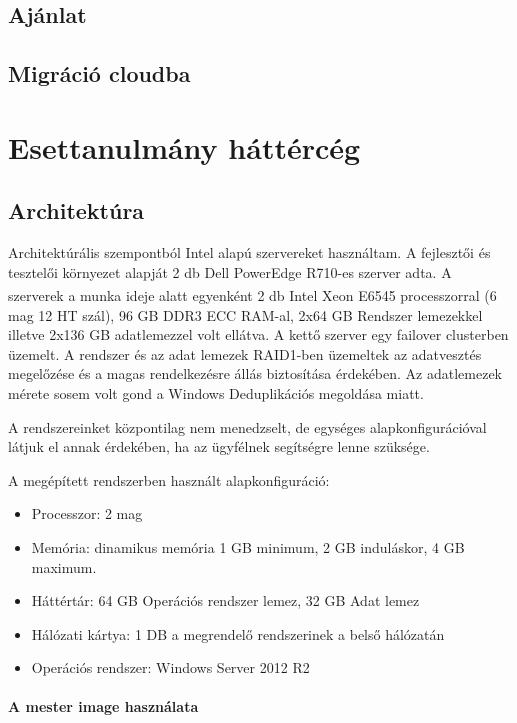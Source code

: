 \documentclass[12pt,oneside,justify,table]{book}
\begin{document}
\section{Ajánlat}


\section{Migráció cloudba}


\chapter{Esettanulmány háttércég}

\section{Architektúra}

Architektúrális szempontból Intel alapú szervereket használtam. A fejlesztői és tesztelői környezet alapját 2 db Dell PowerEdge R710-es szerver adta. A szerverek a munka ideje alatt egyenként 2 db Intel{\textsuperscript{\textregistered}} Xeon{\textsuperscript{\textregistered}} E6545 processzorral (6 mag 12 HT szál), 96 GB DDR3 ECC RAM-al, 2x64 GB Rendszer lemezekkel illetve 2x136 GB adatlemezzel volt ellátva. A kettő szerver egy failover clusterben üzemelt. A rendszer és az adat lemezek RAID1-ben üzemeltek az adatvesztés megelőzése és a magas rendelkezésre állás biztosítása érdekében. Az adatlemezek mérete sosem volt gond a Windows Deduplikációs megoldása miatt.


A rendszereinket központilag nem menedzselt, de egységes alapkonfigurációval látjuk el annak érdekében, ha az ügyfélnek segítségre lenne szüksége. 


A megépített rendszerben használt alapkonfiguráció:
\begin{itemize}
	\item Processzor: 2 mag
	\item Memória: dinamikus memória 1 GB minimum, 2 GB induláskor, 4 GB maximum.
	\item Háttértár: 64 GB Operációs rendszer lemez, 32 GB Adat lemez
	\item Hálózati kártya: 1 DB a megrendelő rendszerinek a belső hálózatán
	\item Operációs rendszer: Windows Server 2012 R2
\end{itemize}

\subsubsection{A mester image használata}
\end{document}
